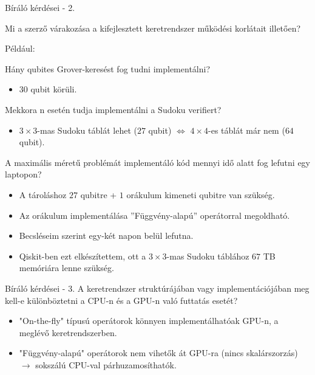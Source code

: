 \documentclass[aspectratio=169]{beamer}
\begin{document}
\begin{frame}{Bíráló kérdései - 2.}

Mi a szerző várakozása a kifejlesztett keretrendszer működési korlátait illetően?

Például:

Hány qubites Grover-keresést fog tudni implementálni?
\begin{itemize}
  \item 30 qubit körüli.
\end{itemize}
Mekkora n esetén tudja implementálni a Sudoku verifiert?
\begin{itemize}
  \item $3\times{}3$-mas Sudoku táblát lehet ($27$ qubit) $\Leftrightarrow$ $4\times{}4$-es táblát már nem ($64$ qubit).
\end{itemize}
A maximális méretű problémát implementáló kód mennyi idő alatt fog lefutni egy laptopon?
\begin{itemize}
  \item A tároláshoz $27$ qubitre + $1$ orákulum kimeneti qubitre van szükség.
  \item Az orákulum implementálása ''Függvény-alapú'' operátorral megoldható.
  \item Becsléseim szerint egy-két napon belül lefutna.
  \item Qiskit-ben ezt elkészítettem, ott a $3\times{}3$-mas Sudoku táblához $67$ TB memóriára lenne szükség.
\end{itemize}
\end{frame}

\begin{frame}{Bíráló kérdései - 3.}
A keretrendszer struktúrájában vagy implementációjában meg kell-e különböztetni a CPU-n és a GPU-n való futtatás esetét?
\begin{itemize}
  \item "On-the-fly" típusú operátorok könnyen implementálhatóak GPU-n, a meglévő keretrendszerben.
  \item "Függvény-alapú" operátorok nem vihetők át GPU-ra (nincs skalárszorzás) $\rightarrow$ sokszálú CPU-val párhuzamosíthatók.
\end{itemize}
\end{frame}
\end{document}
